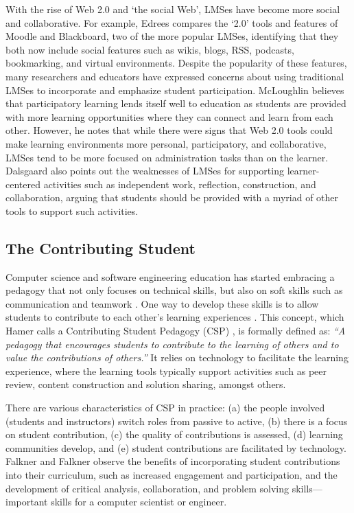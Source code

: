 With the rise of Web 2.0 and `the social Web', LMSes have become more social and collaborative. For example, Edrees \cite{edrees2013elearning} compares the `2.0' tools and features of Moodle and Blackboard, two of the more popular LMSes, identifying that they both now include social features such as wikis, blogs, RSS, podcasts, bookmarking, and virtual environments. Despite the popularity of these features, many researchers and educators have expressed concerns about using traditional LMSes to incorporate and emphasize student participation. McLoughlin \cite{mcloughlin2007social} believes that participatory learning lends itself well to education as students are provided with more learning opportunities where they can connect and learn from each other. However, he notes that while there were signs that Web 2.0 tools could make learning environments more personal, participatory, and collaborative, LMSes tend to be more focused on administration tasks than on the learner. Dalsgaard \cite{dalsgaard2006social} also points out the weaknesses of LMSes for supporting learner-centered activities such as independent work, reflection, construction, and collaboration, arguing that students should be provided with a myriad of other tools to support such activities.

\subsection{The Contributing Student}
Computer science and software engineering education has started embracing a pedagogy that not only focuses on technical skills, but also on soft skills such as communication and teamwork \cite{jazayeri2004education}. One way to develop these skills is to allow students to contribute to each other's learning experiences \cite{hamer2006some}. This concept, which Hamer calls a Contributing Student Pedagogy (CSP) \cite{hamer2008contributing}, is formally defined as: \textit{``A pedagogy that encourages students to contribute to the learning of others and to value the contributions of others.''} It relies on technology to facilitate the learning experience, where the learning tools typically support activities such as peer review, content construction and solution sharing, amongst others.

There are various characteristics of CSP in practice: (a) the people involved (students and instructors) switch roles from passive to active, (b) there is a focus on student contribution, (c) the quality of contributions is assessed, (d) learning communities develop, and (e) student contributions are facilitated by technology. Falkner and Falkner \cite{falkner2012supporting} observe the benefits of incorporating student contributions into their curriculum, such as increased engagement and participation, and the development of critical analysis, collaboration, and problem solving skills---important skills for a computer scientist or engineer.

